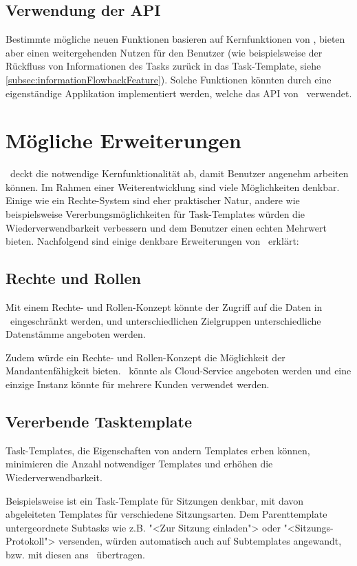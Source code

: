 		\subsection{Verwendung der API}
			Bestimmte mögliche neuen Funktionen basieren auf Kernfunktionen von \eeppi,
			bieten aber einen weitergehenden Nutzen für den Benutzer
			(wie beispielsweise der Rückfluss von Informationen des Tasks zurück in das Task-Template, siehe \ref{subsec:informationFlowbackFeature}).
			Solche Funktionen könnten durch eine eigenständige Applikation implementiert werden,
			welche das API von \eeppi\ verwendet.


	\section{Mögliche Erweiterungen}
	\label{sec:possibleExtensions}
		\eeppi\ deckt die notwendige Kernfunktionalität ab, damit Benutzer angenehm arbeiten können.
		Im Rahmen einer Weiterentwicklung sind viele Möglichkeiten denkbar. 
		Einige wie ein Rechte-System sind eher praktischer Natur, 
		andere wie beispielsweise Vererbungsmöglichkeiten für Task-Templates würden die Wiederverwendbarkeit verbessern und dem Benutzer einen echten Mehrwert bieten.
		Nachfolgend sind einige denkbare Erweiterungen von \eeppi\ erklärt:
		
		\subsection{Rechte und Rollen}
			Mit einem Rechte- und Rollen-Konzept könnte der Zugriff auf die Daten in \eeppi\ eingeschränkt werden,
			und unterschiedlichen Zielgruppen unterschiedliche Datenstämme angeboten werden.
			
			Zudem würde ein Rechte- und Rollen-Konzept die Möglichkeit der Mandantenfähigkeit bieten.
			\eeppi\ könnte als Cloud-Service angeboten werden und eine einzige Instanz könnte für mehrere Kunden verwendet werden.
			
		
		\subsection{Vererbende Tasktemplate}
			Task-Templates, die Eigenschaften von andern Templates erben können, 
			minimieren die Anzahl notwendiger Templates und erhöhen die Wiederverwendbarkeit.
			
			Beispielsweise ist ein Task-Template für Sitzungen denkbar, mit
			davon abgeleiteten Templates für verschiedene Sitzungsarten.
			Dem Parenttemplate untergeordnete Subtasks wie z.B. "<Zur Sitzung einladen"> oder "<Sitzungs-Protokoll"> versenden, würden automatisch auch auf Subtemplates angewandt, bzw. mit diesen ans \ppt\ übertragen.
			
